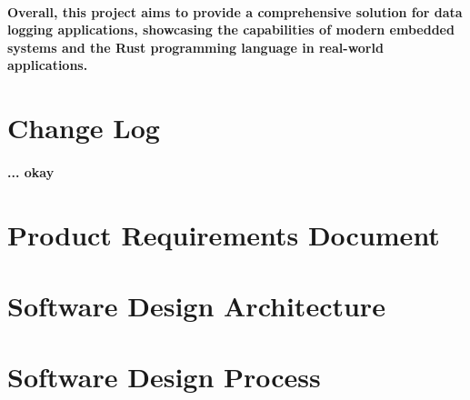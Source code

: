 \documentclass{article}
\begin{document}
\paragraph{
Overall, this project aims to provide a comprehensive solution for data logging
applications, showcasing the capabilities of modern embedded systems and the
Rust programming language in real-world applications.
}


\section{Change Log}
\paragraph{
...
okay
}


\newpage


\section{Product Requirements Document}


\section{Software Design Architecture}


\section{Software Design Process} 
\end{document}
